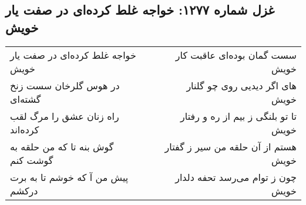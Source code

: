 \begin{center}
\section*{غزل شماره ۱۲۷۷: خواجه غلط کرده‌ای در صفت یار خویش}
\label{sec:1277}
\begin{longtable}{l p{0.5cm} r}
خواجه غلط کرده‌ای در صفت یار خویش
&&
سست گمان بوده‌ای عاقبت کار خویش
\\
در هوس گلرخان سست زنخ گشته‌ای
&&
های اگر دیدیی روی چو گلنار خویش
\\
راه زنان عشق را مرگ لقب کرده‌اند
&&
تا تو بلنگی ز بیم از ره و رفتار خویش
\\
گوش بنه تا که من حلقه به گوشت کنم
&&
هستم از آن حلقه من سیر ز گفتار خویش
\\
پیش من آ که خوشم تا به برت درکشم
&&
چون ز توام می‌رسد تحفه دلدار خویش
\\
\end{longtable}
\end{center}
